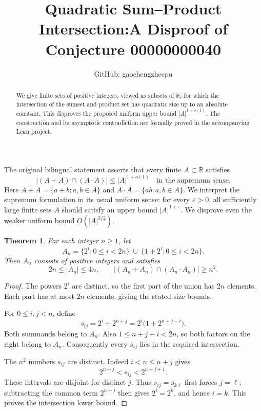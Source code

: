 \documentclass[11pt]{article}
\title{Quadratic Sum--Product Intersection:\newline A Disproof of Conjecture 00000000040}
\author{GitHub: gaochengzhecpu}
\date{}
\newtheorem{theorem}{Theorem}
\newcommand{\R}{\mathbb R}
\begin{document}
\maketitle
\begin{abstract}
We give finite sets of positive integers, viewed as subsets of $\R$, for which the intersection of the sumset and product set has quadratic size up to an absolute constant. This disproves the proposed uniform upper bound $|A|^{1+o(1)}$. The construction and its asymptotic contradiction are formally proved in the accompanying Lean project.
\end{abstract}

The original bilingual statement asserts that every finite $A\subset\R$ satisfies
\[
 |(A+A)\cap(A\cdot A)|\le |A|^{1+o(1)}
 \quad\text{in the supremum sense}.
\]
Here $A+A=\{a+b:a,b\in A\}$ and $A\cdot A=\{ab:a,b\in A\}$. We interpret the supremum formulation in its usual uniform sense: for every $\varepsilon>0$, all sufficiently large finite sets $A$ should satisfy an upper bound $|A|^{1+\varepsilon}$. We disprove even the weaker uniform bound $O(|A|^{3/2})$.

\begin{theorem}\label{thm:family}
For each integer $n\ge1$, let
\[
 A_n=\{2^i:0\le i<2n\}\ \cup\ \{1+2^i:0\le i<2n\}.
\]
Then $A_n$ consists of positive integers and satisfies
\[
 2n\le |A_n|\le4n,
 \qquad |(A_n+A_n)\cap(A_n\cdot A_n)|\ge n^2.
\]
\end{theorem}
\begin{proof}
The powers $2^i$ are distinct, so the first part of the union has $2n$ elements. Each part has at most $2n$ elements, giving the stated size bounds.

For $0\le i,j<n$, define
\[
 s_{ij}=2^i+2^{n+j}=2^i\bigl(1+2^{n+j-i}\bigr).
\]
Both summands belong to $A_n$. Also $1\le n+j-i<2n$, so both factors on the right belong to $A_n$. Consequently every $s_{ij}$ lies in the required intersection.

The $n^2$ numbers $s_{ij}$ are distinct. Indeed $i<n\le n+j$ gives
\[
 2^{n+j}<s_{ij}<2^{n+j+1}.
\]
These intervals are disjoint for distinct $j$. Thus $s_{ij}=s_{k\ell}$ first forces $j=\ell$; subtracting the common term $2^{n+j}$ then gives $2^i=2^k$, and hence $i=k$. This proves the intersection lower bound.
\end{proof}
\end{document}
